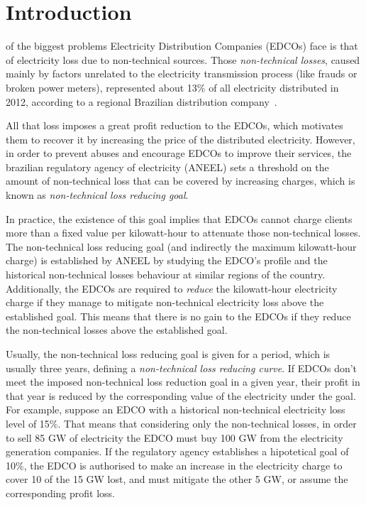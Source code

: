 \section{Introduction}
\label{sec:intro}

 of the biggest problems Electricity Distribution Companies (EDCOs) face is that of electricity loss due to non-technical
sources. Those \textit{non-technical losses}, caused mainly by factors unrelated to the electricity transmission process 
(like frauds or broken power meters), represented about 13\% of all electricity distributed in 2012, according to a regional Brazilian distribution company~\cite{ANEEL2012}.

All that loss imposes a great profit reduction to the EDCOs, which motivates them to recover it by 
increasing the price of the distributed electricity. However, in order to prevent abuses and encourage EDCOs to improve 
their services, the brazilian regulatory agency of electricity (ANEEL) sets a threshold on the amount of non-technical loss
that can be covered by increasing charges, which is known as \textit{non-technical loss reducing goal}.

In practice, the existence of this goal implies that EDCOs cannot charge clients more than a fixed 
value per kilowatt-hour to attenuate those non-technical losses.
The non-technical loss reducing goal (and indirectly the maximum kilowatt-hour charge) is established by ANEEL by studying the EDCO's 
profile and the historical non-technical losses behaviour at similar regions of the country.
Additionally, the EDCOs are required to \textit{reduce} the kilowatt-hour electricity charge if they manage to mitigate non-technical
electricity loss above the established goal. 
This means that there is no gain to the EDCOs if they reduce the non-technical losses above the established goal.

Usually, the non-technical loss reducing goal is given for a period, which is usually three years,
defining a \textit{non-technical loss reducing curve}.
If EDCOs don't meet the imposed non-technical loss reduction goal in a given year, their profit in that year
is reduced by the corresponding value of the electricity under the goal. For example, suppose an EDCO with a historical
non-technical electricity loss level of 15\%. That means that considering only the non-technical losses, in order to sell 85 GW 
of electricity the EDCO must buy 100 GW from the electricity generation companies. If the regulatory agency establishes a hipotetical 
goal of 10\%, the EDCO is authorised to make an increase in the electricity charge to cover 10 of the 15 GW lost, and must mitigate 
the other 5 GW, or assume the corresponding profit loss.

